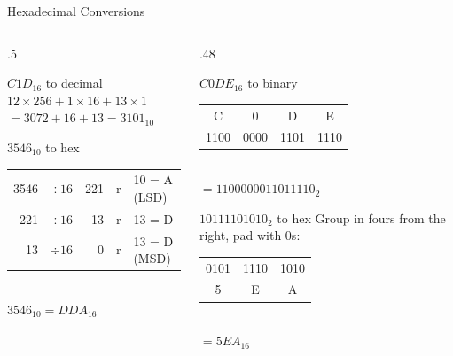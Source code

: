 \documentclass[9pt,aspectratio=169,xcolor=table]{beamer}
\begin{document}
\begin{frame}{Hexadecimal Conversions}
  \begin{columns}[t]
  \begin{column}{.5\textwidth}
    \begin{block}{$C1D_{16}$ to decimal}
      \small $12\!\times\!256 + 1\!\times\!16 + 13\!\times\!1$\\
      $= 3072 + 16 + 13 = 3101_{10}$
    \end{block}
    \begin{block}{$3546_{10}$ to hex}
      \small
      \begin{tabular}{rcrcl}
        3546 & $\div 16$ & 221 & r & 10 = A (LSD) \\
        221 & $\div 16$ & 13 & r & 13 = D \\
        13 & $\div 16$ & 0 & r & 13 = D (MSD) \\
      \end{tabular}\\[1mm]
      $3546_{10} = DDA_{16}$
    \end{block}
  \end{column}
  \begin{column}{.48\textwidth}
    \begin{block}{$C0DE_{16}$ to binary}
      \small
      \begin{tabular}{cccc}
        C & 0 & D & E \\
        1100 & 0000 & 1101 & 1110 \\
      \end{tabular}\\[1mm]
      $= 1100000011011110_2$
    \end{block}
    \begin{block}{$10111101010_2$ to hex}
      \small Group in fours from the right, pad with 0s:\\[1mm]
      \begin{tabular}{ccc}
        0101 & 1110 & 1010 \\
        5 & E & A \\
      \end{tabular}\\[1mm]
      $= 5EA_{16}$
    \end{block}
  \end{column}
  \end{columns}
\end{frame}
\end{document}
